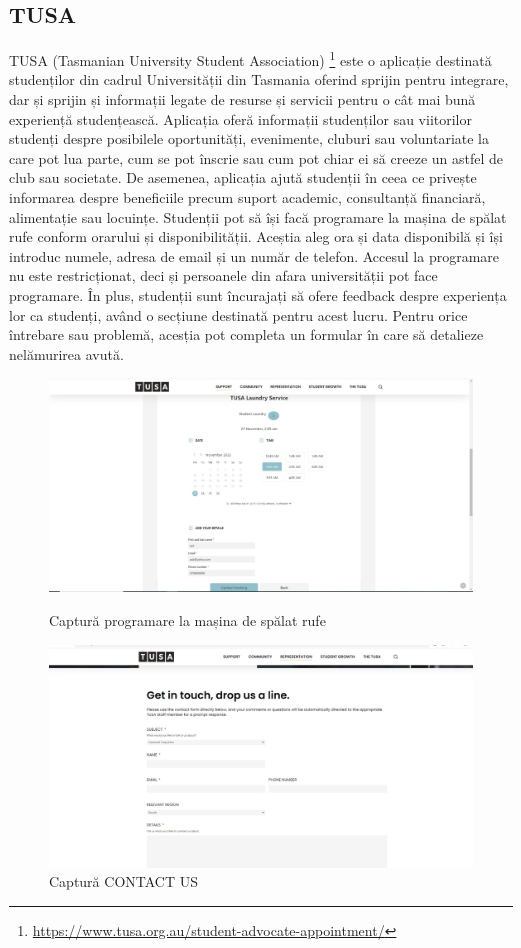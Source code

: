 \documentclass[12pt,a4paper]{report}
\theoremstyle{definition}
\theoremstyle{remark}
\begin{document}
\subsection{TUSA }
\par TUSA (Tasmanian University Student Association) \footnote{\url{https://www.tusa.org.au/student-advocate-appointment/}}  este o aplicație destinată studenților din cadrul Universității din Tasmania oferind sprijin pentru integrare, dar și sprijin și informații legate de resurse și servicii pentru o cât mai bună experiență studențească. Aplicația oferă informații studenților sau viitorilor studenți despre posibilele oportunități, evenimente, cluburi sau voluntariate la care pot lua parte, cum se pot înscrie  sau cum pot chiar ei să creeze un astfel de club sau societate. De asemenea, aplicația ajută studenții în ceea ce privește informarea despre beneficiile precum suport academic, consultanță financiară, alimentație sau locuințe. Studenții pot să își facă programare la mașina de spălat rufe conform orarului și disponibilității. Aceștia aleg ora și data disponibilă și își introduc numele, adresa de email și un număr de telefon. Accesul la programare nu este restricționat, deci și persoanele din afara universității pot face programare.
În plus, studenții sunt încurajați să ofere feedback despre experiența lor ca studenți, având o secțiune  destinată pentru acest lucru. Pentru orice întrebare sau problemă, acesția pot completa un formular în care să  detalieze nelămurirea avută.

\begin{figure}[H]
    \centering
    \includegraphics[scale=0.26]{resurse/aplicatii_similare/tusa.png}
    \caption{Captură programare la mașina de spălat rufe}
    \vspace{15mm}
    \includegraphics[scale=0.26]{resurse/aplicatii_similare/tusa2.png}
    \caption{Captură CONTACT US}
\end{figure}
\end{document}
